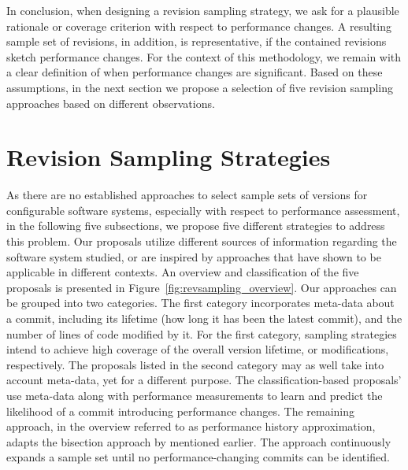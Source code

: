 In conclusion, when designing a revision sampling strategy, we ask for a
plausible rationale or coverage criterion with respect to performance changes.
A resulting sample set of revisions, in addition, is representative, if the
contained revisions sketch performance changes. For the context of this
methodology, we remain with a clear definition of when performance changes are
significant. Based on these assumptions, in the next section we propose a
selection of five revision sampling approaches based on different observations.
 
\section{Revision Sampling Strategies}\label{sec:revsampling_strat}
As there are no established approaches to select sample sets of versions for
configurable software systems, especially with respect to performance
assessment, in the following five subsections, we propose five different
strategies to address this problem. Our proposals utilize different sources of
information regarding the software system studied, or are inspired by
approaches that have shown to be applicable in different contexts. An overview
and classification of the five proposals is presented in
Figure~\ref{fig:revsampling_overview}. 
Our approaches can be grouped into two categories. The first category incorporates
meta-data about a commit, including its lifetime (how long it has been the
latest commit), and the number of lines of code modified by it. For the first
category, sampling strategies intend to achieve high coverage of the overall
version lifetime, or modifications, respectively. The proposals listed in the
second category may as well take into account meta-data, yet for a
different purpose. The classification-based proposals' use meta-data along with
performance measurements to learn and predict the likelihood of a commit
introducing performance changes. The remaining approach, in the overview
referred to as performance history approximation, adapts the bisection approach
by \cite{heger_automated_2013} mentioned earlier. The approach continuously expands a sample
set until no performance-changing commits can be identified.

